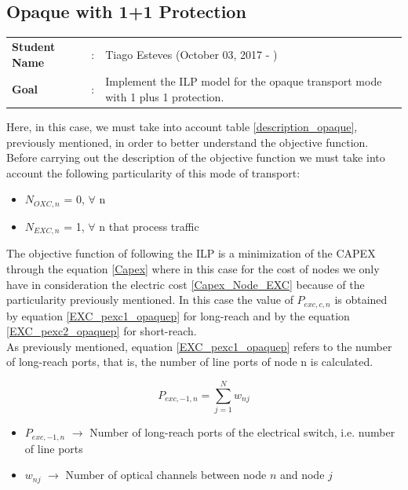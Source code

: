 \clearpage

\subsection{Opaque with 1+1 Protection}\label{ILP_Opaque_Protection}
\begin{tcolorbox}	
\begin{tabular}{p{2.75cm} p{0.2cm} p{10.5cm}} 	
\textbf{Student Name}  &:& Tiago Esteves    (October 03, 2017 - )\\
\textbf{Goal}          &:& Implement the ILP model for the opaque transport mode with 1 plus 1 protection.
\end{tabular}
\end{tcolorbox}
\vspace{11pt}

Here, in this case, we must take into account table \ref{description_opaque}, previously mentioned, in order to better understand the objective function.\\

Before carrying out the description of the objective function we must take into account the following particularity of this mode of transport:
\begin{itemize}
  \item $N_{OXC,n}$ = 0, \quad $\forall$ n
  \item $N_{EXC,n}$ = 1, \quad $\forall$ n that process traffic
\end{itemize}


\vspace{11pt}
The objective function of following the ILP is a minimization of the CAPEX through the equation \ref{Capex} where in this case for the cost of nodes we only have in consideration the electric cost \ref{Capex_Node_EXC} because of the particularity previously mentioned.
In this case the value of $P_{exc,c,n}$ is obtained by equation \ref{EXC_pexc1_opaquep} for long-reach and by the equation \ref{EXC_pexc2_opaquep} for short-reach.\\

As previously mentioned, equation \ref{EXC_pexc1_opaquep} refers to the number of long-reach ports, that is, the number of line ports of node n is calculated.

\begin{equation}
P_{exc,-1,n} = \sum_{j=1}^{N} w_{nj}
\label{EXC_pexc1_opaquep}
\end{equation}

\begin{itemize}
\item{$P_{exc,-1,n}$	$\rightarrow$	Number of long-reach ports of the electrical switch, i.e. number of line ports}
\item{$w_{nj}$			$\rightarrow$	Number of optical channels between node $n$ and node $j$}
\end{itemize}

